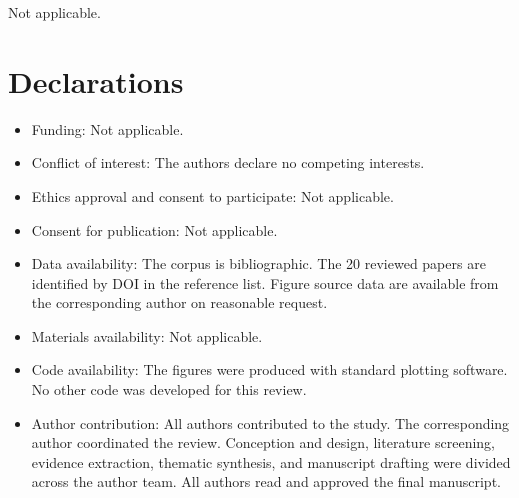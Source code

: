\documentclass[pdflatex,sn-basic,Numbered]{sn-jnl}%
\begin{document}
\backmatter


Not applicable.

\section*{Declarations}

\begin{itemize}
\item Funding: Not applicable.
\item Conflict of interest: The authors declare no competing interests.
\item Ethics approval and consent to participate: Not applicable.
\item Consent for publication: Not applicable.
\item Data availability: The corpus is bibliographic. The 20 reviewed papers are identified by DOI in the reference list. Figure source data are available from the corresponding author on reasonable request.
\item Materials availability: Not applicable.
\item Code availability: The figures were produced with standard plotting software. No other code was developed for this review.
\item Author contribution: All authors contributed to the study. The corresponding author coordinated the review. Conception and design, literature screening, evidence extraction, thematic synthesis, and manuscript drafting were divided across the author team. All authors read and approved the final manuscript.
\end{itemize}


\end{document}
